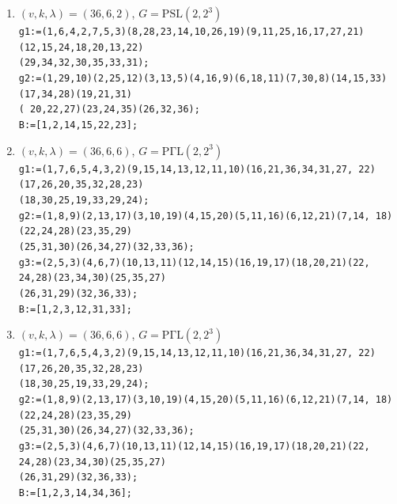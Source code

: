\documentclass[a4paper,twopage,reqno,12pt]{amsart}
\theoremstyle{definition}
\numberwithin{equation}{section}
\newcommand{\PSL}{\mathrm{PSL}}
\newcommand{\PGaL}{\mathrm{P\Gamma L}}
\newcommand{\Aut}{\mathrm{Aut}}
\begin{document}
\begin{enumerate}
    \item\label{3662}$(v,k,\lambda)=(36,6,2)$, $G=\PSL(2,2^3)$\\
    {\scriptsize \texttt{g1:=(1,6,4,2,7,5,3)(8,28,23,14,10,26,19)(9,11,25,16,17,27,21)(12,15,24,18,20,13,22)\\
      (29,34,32,30,35,33,31);}\\
    \texttt{g2:=(1,29,10)(2,25,12)(3,13,5)(4,16,9)(6,18,11)(7,30,8)(14,15,33)(17,34,28)(19,21,31)\\(
      20,22,27)(23,24,35)(26,32,36);}\\}
    \texttt{B:=[1,2,14,15,22,23];}\\

    \item\label{3666_1} $(v,k,\lambda)=(36,6,6)$, $G=\PGaL(2,2^3)$\\
    {\scriptsize \texttt{g1:=(1,7,6,5,4,3,2)(9,15,14,13,12,11,10)(16,21,36,34,31,27,
22)(17,26,20,35,32,28,23)\\(18,30,25,19,33,29,24);}\\
    \texttt{g2:=(1,8,9)(2,13,17)(3,10,19)(4,15,20)(5,11,16)(6,12,21)(7,14,
18)(22,24,28)(23,35,29)\\(25,31,30)(26,34,27)(32,33,36);}\\
    \texttt{g3:=(2,5,3)(4,6,7)(10,13,11)(12,14,15)(16,19,17)(18,20,21)(22,
24,28)(23,34,30)(25,35,27)\\(26,31,29)(32,36,33);}\\}
    \texttt{B:=[1,2,3,12,31,33];}\\

     \item\label{3666_2} $(v,k,\lambda)=(36,6,6)$, $G=\PGaL(2,2^3)$\\
     {\scriptsize \texttt{g1:=(1,7,6,5,4,3,2)(9,15,14,13,12,11,10)(16,21,36,34,31,27,
22)(17,26,20,35,32,28,23)\\(18,30,25,19,33,29,24);}\\
    \texttt{g2:=(1,8,9)(2,13,17)(3,10,19)(4,15,20)(5,11,16)(6,12,21)(7,14,
18)(22,24,28)(23,35,29)\\(25,31,30)(26,34,27)(32,33,36);}\\
    \texttt{g3:=(2,5,3)(4,6,7)(10,13,11)(12,14,15)(16,19,17)(18,20,21)(22,
24,28)(23,34,30)(25,35,27)\\(26,31,29)(32,36,33);}\\}
    \texttt{B:=[1,2,3,14,34,36];}\\


\end{enumerate}
\end{document}
